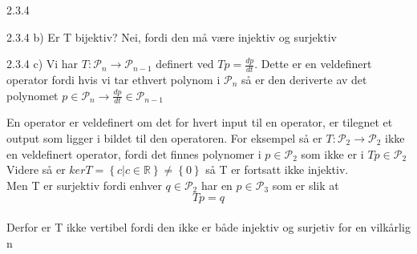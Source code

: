 \documentclass[a4paper,norsk]{article}
\begin{document}
\begin{oppgavebox}{2.3.4}{}
\begin{proofbox}{2.3.4 b)}{}
Er T bijektiv? Nei, fordi den må være injektiv og surjektiv
\end{proofbox}

\begin{proofbox}{2.3.4 c)}{}
Vi har $ T: \mathcal{P}_n \rightarrow \mathcal{P}_{n-1} $ definert ved $ Tp = \frac{ dp }{ dt } $. Dette er en veldefinert operator fordi hvis vi tar ethvert polynom i $ \mathcal{P}_n $ så er den deriverte av det polynomet $ p \in \mathcal{P}_n \rightarrow \frac{ dp }{ dt } \in \mathcal{P}_{n-1} $ 

En operator er veldefinert om det for hvert input til en operator, er tilegnet et output som ligger i bildet til den operatoren. For eksempel så er $ T: \mathcal{P}_2 \rightarrow \mathcal{P}_2 $ ikke en veldefinert operator, fordi det finnes polynomer i $ p \in \mathcal{P}_2 $ som ikke er i $ Tp \in \mathcal{P}_2 $\\

Videre så er $ ker T = \left\{ c | c \in  \mathbb{R} \right\} \neq \left\{ 0 \right\}  $ så T er fortsatt ikke injektiv. \\

Men T er surjektiv fordi enhver $ q \in \mathcal{P}_2 $ har en $ p \in \mathcal{P}_3  $ som er slik at 
\[
    Tp = q
\]\\
Derfor er T ikke vertibel fordi den ikke er både injektiv og surjetiv for en vilkårlig n
\end{proofbox}
\end{oppgavebox}
\end{document}
